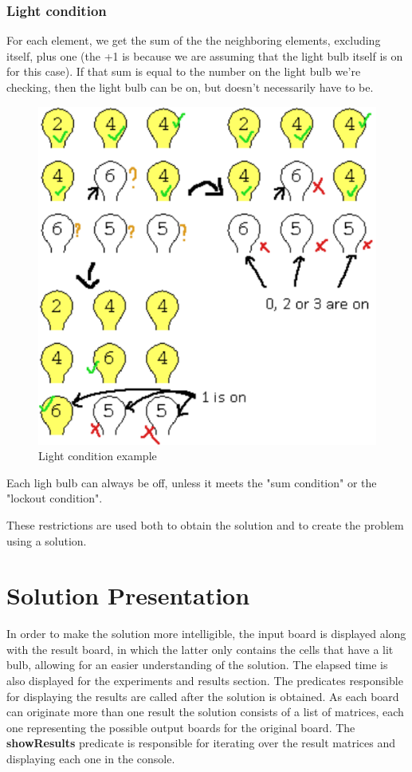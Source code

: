 \documentclass[runningheads]{llncs}
\begin{document}
\subsubsection*{Light condition} \hfill \break
For each element, we get the sum of the the neighboring elements, excluding itself, plus one (the +1 is because we are assuming that the light bulb itself is on for this case).
If that sum is equal to the number on the light bulb we're checking, then the light bulb can be on, but doesn't necessarily have to be.

\begin{figure}
	\includegraphics[scale=0.5]{lightbulb_light_condition_example}
	\centering
	\caption{Light condition example}
	\centering
\end{figure}

Each ligh bulb can always be off, unless it meets the "sum condition" or the "lockout condition".

These restrictions are used both to obtain the solution and to create the problem using a solution.



\clearpage
\section{Solution Presentation}
In order to make the solution more intelligible, the input board is displayed along with the result board, in which the latter
only contains the cells that have a lit bulb, allowing for an easier understanding of the solution. The elapsed time is also displayed for the experiments and results section.
The predicates responsible for displaying the results are called after the solution is obtained. As each board can originate more than one result the solution consists of a list of matrices, each one representing the possible output boards for the original board. The \textbf{showResults} predicate is responsible for iterating over the result matrices and displaying each one in the console.
\end{document}
